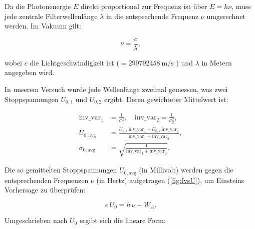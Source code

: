 Da die Photonenergie $E$ direkt proportional zur Frequenz ist über $E = h\nu$, muss jede zentrale Filterwellenlänge $\lambda$ in die entsprechende Frequenz $\nu$ umgerechnet werden. Im Vakuum gilt:

\begin{equation}
    \nu = \frac{c}{\lambda},
\end{equation}

wobei $c$ die Lichtgeschwindigkeit ist ($= \SI{299 792 458}{\metre\per\second}$ \cite{codata}) und $\lambda$ in Metern angegeben wird.

In unserem Versuch wurde jede Wellenlänge zweimal gemessen, was zwei Stoppspannungen $U_{0,1}$ und $U_{0,2}$ ergibt. Deren gewichteter Mittelwert ist:

\begin{equation}
  \begin{aligned}
    \mathrm{inv\_var}_1 &= \frac{1}{\sigma_{1}^{2}},\quad
    \mathrm{inv\_var}_2 = \frac{1}{\sigma_{2}^{2}},\\[1ex]
    U_{0,\mathrm{avg}}  &= \frac{U_{0,1}\,\mathrm{inv\_var}_1 + U_{0,2}\,\mathrm{inv\_var}_2}
                               {\mathrm{inv\_var}_1 + \mathrm{inv\_var}_2},\\[1ex]
    \sigma_{0,\mathrm{avg}} &= \sqrt{\frac{1}{\mathrm{inv\_var}_1 + \mathrm{inv\_var}_2}}.
  \end{aligned}
\end{equation}

Die so gemittelten Stoppspannungen $U_{0,\mathrm{avg}}$ (in Millivolt) werden gegen die entsprechenden Frequenzen $\nu$ (in Hertz) aufgetragen (\cref{fig:fvsU}), um Einsteins Vorhersage zu überprüfen:

\begin{equation}
  e\,U_{0} = h\,\nu - W_{A}.
\end{equation}

Umgeschrieben nach $U_{0}$ ergibt sich die lineare Form:

